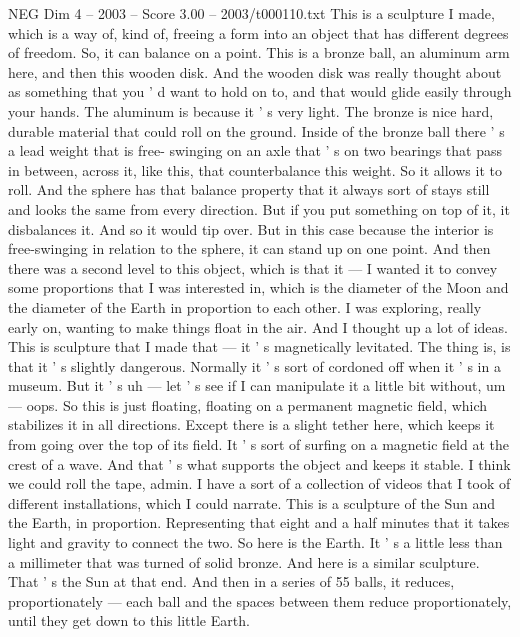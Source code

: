 \begin{textsample}{NEG Dim 4 – 2003 – Score 3.00 – 2003/t000110.txt}  \label{ex:f4_neg_047}
This is a sculpture I made, which is a way of, kind of, freeing a form into an object that has different degrees of freedom.
So, it can balance on a point.
This is a bronze ball, an aluminum arm here, and then this wooden disk.
And the wooden disk was really thought about as something that you ' d want to hold on to, and that would glide easily through your hands.
The aluminum is because it ' s very light.
The bronze is nice hard, durable material that could roll on the ground.
Inside of the bronze ball there ' s a lead weight that is free- swinging on an axle that ' s on two bearings that pass in between, across it, like this, that counterbalance this weight.
So it allows it to roll.
And the sphere has that balance property that it always sort of stays still and looks the same from every direction.
But if you put something on top of it, it disbalances it.
And so it would tip over.
But in this case because the interior is free-swinging in relation to the sphere, it can stand up on one point.
And then there was a second level to this object, which is that it — I wanted it to convey some proportions that I was interested in, which is the diameter of the Moon and the diameter of the Earth in proportion to each other.
I was exploring, really early on, wanting to make things float in the air.
And I thought up a lot of ideas.
This is sculpture that I made that — it ' s magnetically levitated.
The thing is, is that it ' s slightly dangerous.
Normally it ' s sort of cordoned off when it ' s in a museum.
But it ' s uh — let ' s see if I can manipulate it a little bit without, um — oops.
So this is just floating, floating on a permanent magnetic field, which stabilizes it in all directions.
Except there is a slight tether here, which keeps it from going over the top of its field.
It ' s sort of surfing on a magnetic field at the crest of a wave.
And that ' s what supports the object and keeps it stable.
I think we could roll the tape, admin.
I have a sort of a collection of videos that I took of different installations, which I could narrate.
This is a sculpture of the Sun and the Earth, in proportion.
Representing that eight and a half minutes that it takes light and gravity to connect the two.
So here is the Earth.
It ' s a little less than a millimeter that was turned of solid bronze.
And here is a similar sculpture.
That ' s the Sun at that end.
And then in a series of 55 balls, it reduces, proportionately — each ball and the spaces between them reduce proportionately, until they get down to this little Earth.

\end{textsample}

